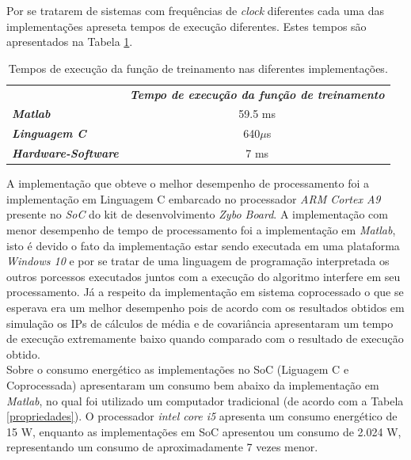 Por se tratarem de sistemas com frequências de \textit{clock} diferentes cada uma das implementações apreseta tempos de execução diferentes. Estes tempos são apresentados na Tabela \ref{tempos}.
\newpage 

\begin{table}[!h]
	\centering
	\caption{Tempos de execução da função de treinamento nas diferentes implementações.}
	\label{tempos}
	\begin{tabular}{lc}
		\rowcolor[HTML]{DAE8FC} 
		\multicolumn{1}{c}{\cellcolor[HTML]{DAE8FC}\textbf{Implementação}} & \textit{\textbf{Tempo de execução da função de treinamento}} \\
		\textit{\textbf{Matlab}}                                           & 59.5 ms                                                     \\
		\rowcolor[HTML]{DAE8FC} 
		\textit{\textbf{Linguagem C}}                                      & 640$\mu$s                                                 \\
		\textit{\textbf{Hardware-Software}}                                & 7 ms                                                       
	\end{tabular}
\end{table}

A implementação que obteve o melhor desempenho de processamento foi a implementação em Linguagem C embarcado no processador \textit{ARM Cortex A9} presente no \textit{SoC} do kit de desenvolvimento \textit{Zybo Board}. A implementação com menor desempenho de tempo de processamento foi a implementação em \textit{Matlab}, isto é devido o fato da implementação estar sendo executada em uma plataforma \textit{Windows 10} e por se tratar de uma linguagem de programação interpretada os outros porcessos executados juntos com a execução do algoritmo interfere em seu processamento. Já a respeito da implementação em sistema coprocessado o que se esperava era um melhor desempenho pois de acordo com os resultados obtidos em simulação os IPs de cálculos de média e de covariância apresentaram um tempo de execução extremamente baixo quando comparado com o resultado de execução obtido.\\

Sobre o consumo energético as implementações no SoC (Liguagem C e Coprocessada) apresentaram um consumo bem abaixo da implementação em \textit{Matlab}, no qual foi utilizado um computador tradicional (de acordo com a Tabela \ref{propriedades}). O processador \textit{intel core i5} apresenta um consumo energético de 15 W, enquanto as implementações em SoC apresentou um consumo de 2.024 W, representando um consumo de aproximadamente 7 vezes menor.